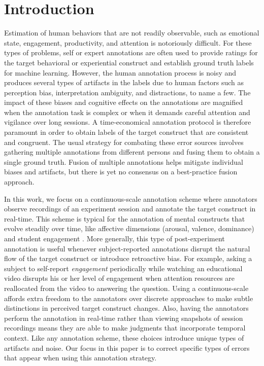 \documentclass[10pt,letterpaper]{article}
\begin{document}
\section*{Introduction}
Estimation of human behaviors that are not readily observable, such as emotional state, engagement, productivity, and attention is notoriously difficult.  For these types of problems, self or expert annotations are often used to provide ratings for the target behavioral or experiential construct and establish ground truth labels for machine learning.  However, the human annotation process is noisy and produces several types of artifacts in the labels due to human factors such as perception bias, interpretation ambiguity, and distractions, to name a few.  The impact of these biases and cognitive effects on the annotations are magnified when the annotation task is complex or when it demands careful attention and vigilance over long sessions.  A time-economical annotation protocol is therefore paramount in order to obtain labels of the target construct that are consistent and congruent.  The usual strategy for combating these error sources involves gathering multiple annotations from different persons and fusing them to obtain a single ground truth.  Fusion of multiple annotations helps mitigate individual biases and artifacts, but there is yet no consensus on a best-practice fusion approach.

In this work, we focus on a continuous-scale annotation scheme where annotators observe recordings of an experiment session and annotate the target construct in real-time.  This scheme is typical for the annotation of mental constructs that evolve steadily over time, like affective dimensions (arousal, valence, dominance) \cite{mckeown2012semaine, metallinou2013tracking, metallinou2013annotation, ringeval2013introducing, valstar2016avec} and student engagement \cite{???}. More generally, this type of post-experiment annotation is useful whenever subject-reported annotations disrupt the natural flow of the target construct or introduce retroactive bias. For example, asking a subject to self-report \textit{engagement} periodically while watching an educational video disrupts his or her level of engagement when attention resources are reallocated from the video to answering the question.  Using a continuous-scale affords extra freedom to the annotators over discrete approaches to make subtle distinctions in perceived target construct changes.  Also, having the annotators perform the annotation in real-time rather than viewing snapshots of session recordings means they are able to make judgments that incorporate temporal context.  Like any annotation scheme, these choices introduce unique types of artifacts and noise.  Our focus in this paper is to correct specific types of errors that appear when using this annotation strategy.
\end{document}
